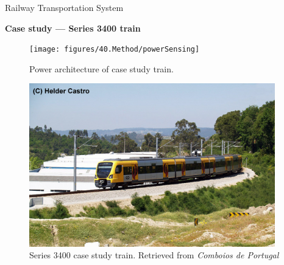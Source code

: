 \begin{frame}{Railway Transportation System}
\begin{block}{\textbf{Case study --- Series 3400 train}}

	\begin{minipage}[t]{0.48\linewidth}
		
		
		\begin{figure}[ht!]
			\centering
			\texttt{[image: figures/40.Method/powerSensing]}
			\caption{Power architecture of case study train.}
		\end{figure}
	\end{minipage}\hfill
	\begin{minipage}[t]{0.48\linewidth}
		
		
		\begin{figure}[ht!]
			\centering
					\vspace{2em}
			\includegraphics[width=0.95\textwidth,keepaspectratio]{figures/40.Method/CP3400}
			\caption{Series 3400 case study train. Retrieved from \textit{Comboios de Portugal}}
		\end{figure}
		
		
		
	\end{minipage}
	
	
\end{block}
\end{frame}